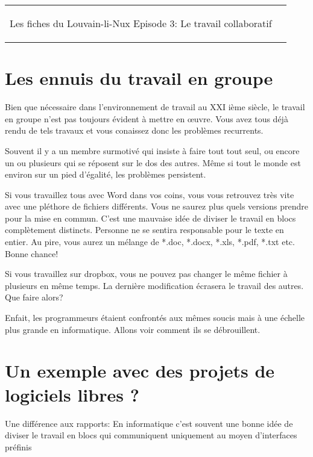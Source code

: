 



\begin{tabular}{p{13cm}r}
	\begin{center}{\Large Les fiches du Louvain-li-Nux\linebreak \linebreak
	\LARGE Episode 3: Le travail collaboratif}\end{center}
		&
	\usebox{\logollnux}
\end{tabular}


\section*{Les ennuis du travail en groupe}
Bien que nécessaire dans l'environnement de travail au XXI ième siècle, le travail
en groupe n'est pas toujours évident à mettre en \oe uvre. 
Vous avez tous déjà rendu de tels travaux et vous conaissez donc les problèmes recurrents.

Souvent il y a un membre surmotivé qui insiste à faire tout tout seul, ou encore
un ou plusieurs qui se réposent sur le dos des autres. Même si tout le monde est environ
sur un pied d'égalité, les problèmes persistent. 

Si vous travaillez tous avec Word dans vos coins, vous vous retrouvez très vite avec une pléthore de fichiers différents.
Vous ne saurez plus quels versions prendre pour la mise en commun. 
C'est une mauvaise idée de diviser le travail en blocs complètement distincts.
Personne ne se sentira responsable pour le texte en entier.
Au pire, vous aurez un mélange de *.doc, *.docx, *.xls, *.pdf, *.txt etc. Bonne chance!

Si vous travaillez sur dropbox, vous ne pouvez pas changer le même fichier à plusieurs en même temps.
La dernière modification écrasera le travail des autres. Que faire alors?

Enfait, les programmeurs étaient confrontés aux mêmes soucis mais 
à une échelle plus grande  en informatique. Allons voir comment ils se débrouillent.

\section*{Un exemple avec des projets de logiciels libres ?}
Une différence aux rapports: En informatique c'est souvent une bonne idée de diviser le travail en blocs qui communiquent uniquement au moyen d'interfaces préfinis

